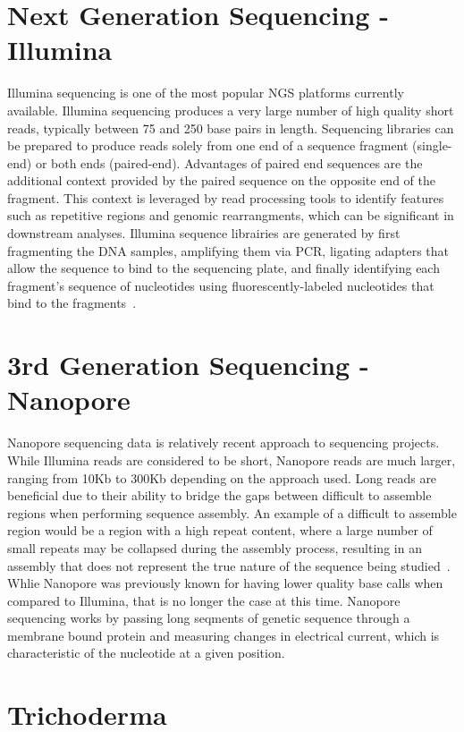 \section{Next Generation Sequencing - Illumina}
Illumina sequencing is one of the most popular NGS platforms currently
available. Illumina sequencing produces a very large number of high
quality short reads, typically between 75 and 250 base pairs in
length. Sequencing libraries can be prepared to produce reads solely
from one end of a sequence fragment (single-end) or both ends
(paired-end). Advantages of paired end sequences are the additional
context provided by the paired sequence on the opposite end of the
fragment. This context is leveraged by read processing tools to
identify features such as repetitive regions and genomic
rearrangments, which can be significant in downstream
analyses. Illumina sequence librairies are generated by first
fragmenting the DNA samples, amplifying them via PCR, ligating
adapters that allow the sequence to bind to the sequencing plate, and
finally identifying each fragment's sequence of nucleotides using
fluorescently-labeled nucleotides that bind to the
fragments~\cite{Goodwin2016}.

\section{3rd Generation Sequencing - Nanopore}

Nanopore sequencing data is relatively recent approach to sequencing
projects. While Illumina reads are considered to be short, Nanopore
reads are much larger, ranging from 10Kb to 300Kb depending on the
approach used. Long reads are beneficial due to their ability to
bridge the gaps between difficult to assemble regions when performing
sequence assembly. An example of a difficult to assemble region would
be a region with a high repeat content, where a large number of small
repeats may be collapsed during the assembly process, resulting in an
assembly that does not represent the true nature of the sequence being
studied~\cite{Marx2023}. Whlie Nanopore was previously known for
having lower quality base calls when compared to Illumina, that is no
longer the case at this time. Nanopore sequencing works by passing
long seqments of genetic sequence through a membrane bound protein and
measuring changes in electrical current, which is characteristic of
the nucleotide at a given position.

\section{Trichoderma}

